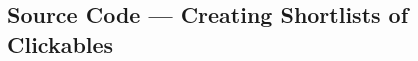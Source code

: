 \documentclass[11pt,openright,a4paper]{report}
\begin{document}
\begin{landscape}
\begin{multicols}{2}








\section{Source Code --- Creating Shortlists of Clickables}

\end{multicols}
\end{landscape}
\end{document}
